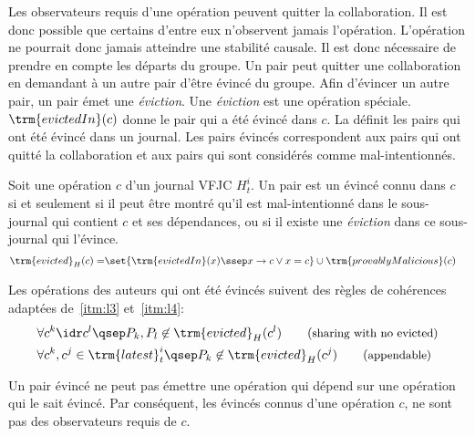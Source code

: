 
Les observateurs requis d'une opération peuvent quitter la collaboration.
Il est donc possible que certains d'entre eux n'observent jamais l'opération.
L'opération ne pourrait donc jamais atteindre une stabilité causale.
Il est donc nécessaire de prendre en compte les départs du groupe.
Un pair peut quitter une collaboration en demandant à un autre pair d'être évincé du groupe.
Afin d'évincer un autre pair, un pair émet une \emph{éviction}.
Une \emph{éviction} est une opération spéciale.
$\trm{evictedIn}(c)$ donne le pair qui a été évincé dans $c$.
La  définit les pairs qui ont été évincé dans un journal.
Les pairs évincés correspondent aux pairs qui ont quitté la collaboration et aux pairs qui sont considérés comme mal-intentionnés.



\begin{definition}\label{def:known-evicted}
Soit une opération $c$ d'un journal \ac{VFJC} $H^i_t$.
Un pair est un évincé connu dans $c$ si et seulement si il peut être montré qu'il est mal-intentionné dans le sous-journal qui contient $c$ et ses dépendances, ou si il existe une \emph{éviction} dans ce sous-journal qui l'évince.
\begin{align*}
\trm{evicted}_H(c) = &\set{\trm{evictedIn}(x) \ssep x \to c \lor x = c} \cup \trm{provablyMalicious}(c)
\end{align*}
\end{definition}

Les opérations des auteurs qui ont été évincés suivent des règles de cohérences adaptées de~\ref{itm:l3} et~\ref{itm:l4}:
\begin{align*}
\forall &c^k \idr c^l \qsep P_k, P_l \not\in \trm{evicted}_H(c^l) \tag{\small sharing with no evicted}\\
\forall &c^k, c^j \in \trm{latest}^i_t \qsep P_k \not\in \trm{evicted}_H(c^j) \tag{\small appendable}
\end{align*}

Un pair évincé ne peut pas émettre une opération qui dépend sur une opération qui le sait évincé.
Par conséquent, les évincés connus d'une opération $c$, ne sont pas des observateurs requis de $c$.

